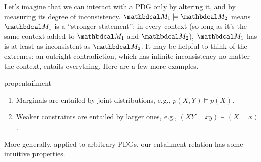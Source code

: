     Let's imagine that we can interact with a PDG only by altering it, and by measuring its degree of inconsistency.
    $\dg M_1 \models \dg M_2$ means $\dg M_1$ is a ``stronger statement'': in every context (so long as it's the same context added to $\dg M_1$ and $\dg M_2$), $\dg M_1$ has is at least as inconsistent as $\dg M_2$. 
    It may be helpful to think of the extremes: 
    an outright contradiction, which has infinite inconsistency no matter the context, entails everything.  Here are a few more examples. 
    
    
    \begin{linked}{prop}{entailment}
    \begin{enumerate}[parsep=0pt,itemsep=0.2ex]
        \item Marginals are entailed by joint distributions, e.g., $p(X,Y) \models p(X)$.
        \item Weaker constraints are entailed by larger ones, e.g., $(XY {=}xy) \models (X{=}x)$. 
    \end{enumerate}   
    \end{linked}
    
    More generally, applied to arbitrary PDGs, our entailment relation has some intuitive properties. 
    
